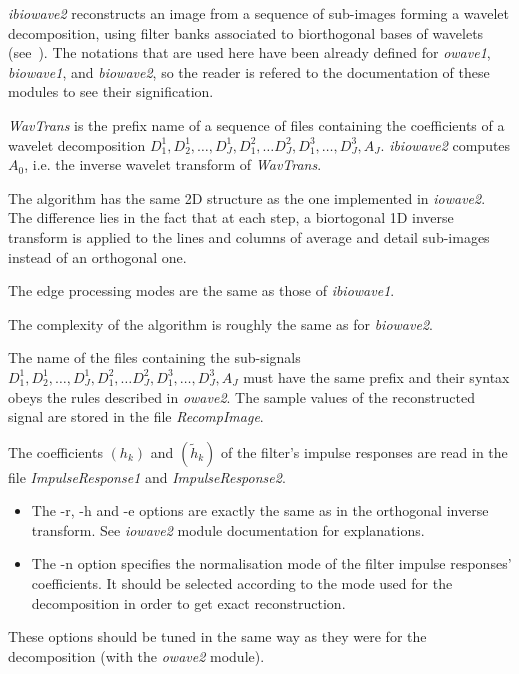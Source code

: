 {\em ibiowave2} reconstructs an image from a sequence of sub-images forming 
a wavelet decomposition, using filter banks associated to biorthogonal bases 
of wavelets (see~\cite{cohen.daubechies.ea:biorthogonal}). 
The notations that are used here have been already defined for {\em owave1}, 
{\em biowave1}, and {\em biowave2}, so the reader is refered 
to the documentation of these modules to see their signification. 

{\em WavTrans} is the prefix name of a sequence of files containing 
the coefficients of a wavelet decomposition  $D^{1}_{1}, D^{1}_{2}, \ldots, 
D^{1}_{J}, D^{2}_{1}, \ldots D^{2}_{J}, D^{3}_{1}, \ldots, D^{3}_{J}, A_{J}$. 
{\em ibiowave2} computes \( A_{0} \), i.e. the inverse wavelet transform 
of {\em WavTrans}. 

The algorithm has the same 2D structure as the one implemented in 
{\em iowave2}. The difference lies in the fact that at each step, 
a biortogonal 1D inverse transform is applied to the lines and 
columns of average and detail sub-images instead of an orthogonal one. 

The edge processing modes are the same as those of {\em ibiowave1}.

The complexity of the algorithm is roughly the same as for {\em biowave2}.

The name of the files containing the sub-signals 
$D^{1}_{1}, D^{1}_{2}, \ldots, D^{1}_{J}, D^{2}_{1}, \ldots D^{2}_{J}, 
D^{3}_{1}, \ldots, D^{3}_{J}, A_{J}$ must have the same prefix 
and their syntax obeys the rules described in {\em owave2}. 
The sample values of the reconstructed signal are stored in the file 
{\em RecompImage}. 

The coefficients $(h_{k})$ and $(\tilde{h}_{k})$ of the filter's impulse 
responses are read in the file {\em ImpulseResponse1} 
and {\em ImpulseResponse2}.

\begin{itemize}
\item
The -r, -h and -e options are exactly the same as in the orthogonal inverse 
transform. See {\em iowave2} module documentation for explanations. 
\item
The -n option specifies the normalisation mode of the filter impulse 
responses' coefficients. It should be selected according to the mode 
used for the decomposition in order to get exact reconstruction. 
\end{itemize}

These options should be tuned in the same way as they were 
for the decomposition (with the {\em owave2} module). 


